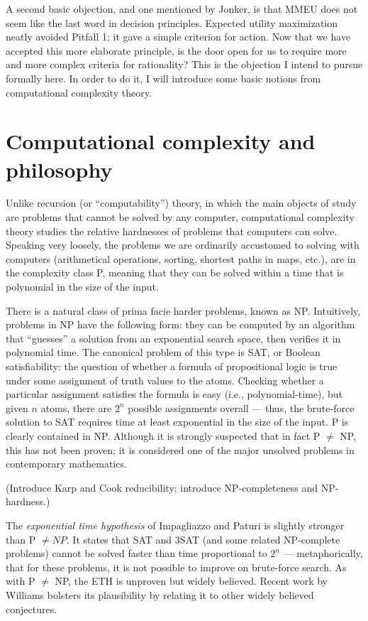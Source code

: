 \documentclass[letterpaper,12pt]{article}
\begin{document}
A second basic objection, and one mentioned by Jonker, is that MMEU does not seem like the last word in decision principles. Expected utility maximization neatly avoided Pitfall 1; it gave a simple criterion for action. Now that we have accepted this more elaborate principle, is the door open for us to require more and more complex criteria for rationality? This is the objection I intend to pursue formally here. In order to do it, I will introduce some basic notions from computational complexity theory.

\section{Computational complexity and philosophy}
Unlike recursion (or ``computability'') theory, in which the main objects of study are problems that cannot be solved by any computer, computational complexity theory studies the relative hardnesses of problems that computers can solve. Speaking very loosely, the problems we are ordinarily accustomed to solving with computers (arithmetical operations, sorting, shortest paths in maps, etc.), are in the complexity class P, meaning that they can be solved within a time that is polynomial in the size of the input.

There is a natural class of prima facie harder problems, known as NP. Intuitively, problems in NP have the following form: they can be computed by an algorithm that ``guesses'' a solution from an exponential search space, then verifies it in polynomial time. The canonical problem of this type is SAT, or Boolean satisfiability: the question of whether a formula of propositional logic is true under some assignment of truth values to the atoms. Checking whether a particular assignment satisfies the formula is easy (i.e., polynomial-time), but given $n$ atoms, there are $2^n$ possible assignments overall --- thus, the brute-force solution to SAT requires time at least exponential in the size of the input. P is clearly contained in NP. Although it is strongly suspected that in fact P $\not =$ NP, this has not been proven; it is considered one of the major unsolved problems in contemporary mathematics. 

(Introduce Karp and Cook reducibility; introduce NP-completeness and NP-hardness.)

The \emph{exponential time hypothesis} of Impagliazzo and Paturi is slightly stronger than P $\not = NP$. It states that SAT and 3SAT (and some related NP-complete problems) cannot be solved faster than time proportional to $2^n$ --- metaphorically, that for these problems, it is not possible to improve on brute-force search. As with P $\not =$ NP, the ETH is unproven but widely believed. Recent work by Williams bolsters its plausibility by relating it to other widely believed conjectures.
\end{document}

